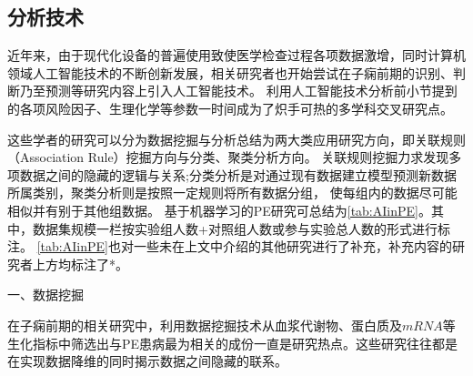 \subsection{分析技术}
近年来，由于现代化设备的普遍使用致使医学检查过程各项数据激增，同时计算机领域人工智能技术的不断创新发展，相关研究者也开始尝试在子痫前期的识别、判断乃至预测等研究内容上引入人工智能技术。
利用人工智能技术分析前小节提到的各项风险因子、生理化学等参数一时间成为了炽手可热的多学科交叉研究点。

这些学者的研究可以分为数据挖掘与分析总结为两大类应用研究方向，即关联规则（Association Rule）挖掘方向与分类、聚类分析方向\cite{Mehta2016}。
关联规则挖掘力求发现多项数据之间的隐藏的逻辑与关系;分类分析是对通过现有数据建立模型预测新数据所属类别，聚类分析则是按照一定规则将所有数据分组，
使每组内的数据尽可能相似并有别于其他组数据\cite{Han2006}。
基于机器学习的PE研究可总结为\autoref{tab:AIinPE}。其中，数据集规模一栏按实验组人数+对照组人数或参与实验总人数的形式进行标注。
\autoref{tab:AIinPE}也对一些未在上文中介绍的其他研究进行了补充，补充内容的研究者上方均标注了*。

一、数据挖掘

在子痫前期的相关研究中，利用数据挖掘技术从血浆代谢物、蛋白质及$mRNA$等生化指标中筛选出与PE患病最为相关的成份一直是研究热点。这些研究往往都是在实现数据降维的同时揭示数据之间隐藏的联系。

